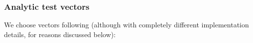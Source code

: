 \documentclass[reqno]{amsart}
\theoremstyle{plain} \newtheorem{theorem} {Theorem}
\theoremstyle{definition} \newtheorem{definition} [theorem] {Definition}
\theoremstyle{itplain} %
\numberwithin{equation}{section}
\numberwithin{theorem}{section}
\begin{document}




\subsubsection{Analytic test vectors}\label{sec:analyt-test-vect}
We choose vectors following \cite{nelson-venkatesh-1} (although with completely different implementation details, for reasons discussed below):
\end{document}
